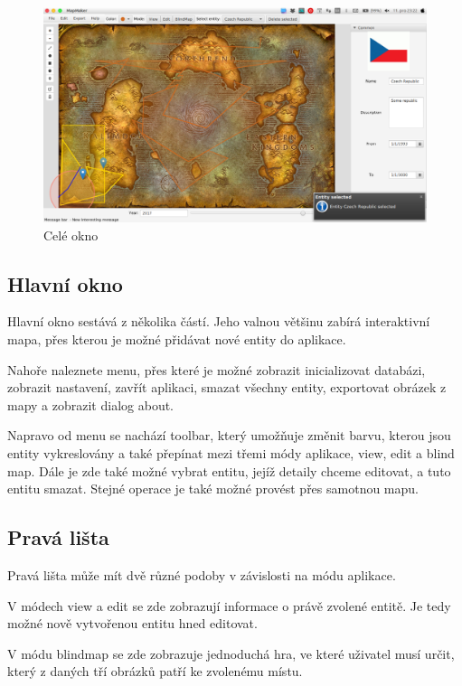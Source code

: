 \documentclass[12pt,a4paper,titlepage]{article}
\begin{document}
\begin{figure}[!htbp]
	\centering
	\includegraphics[scale=0.3]{full_window}
	\caption{Celé okno}
	\label{fullWindow}
\end{figure}

\subsection{Hlavní okno}
Hlavní okno sestává z několika částí. Jeho valnou většinu zabírá interaktivní mapa, přes kterou je možné přidávat nové entity do aplikace. 

Nahoře naleznete menu, přes které je možné zobrazit inicializovat databázi, zobrazit nastavení, zavřít aplikaci, smazat všechny entity, exportovat obrázek z mapy a zobrazit dialog about. 

Napravo od menu se nachází toolbar, který umožňuje změnit barvu, kterou jsou entity vykreslovány a také přepínat mezi třemi módy aplikace, view, edit a blind map. Dále je zde také možné vybrat entitu, jejíž detaily chceme editovat, a tuto entitu smazat. Stejné operace je také možné provést přes samotnou mapu.

\subsection{Pravá lišta}
Pravá lišta může mít dvě různé podoby v závislosti na módu aplikace.

V módech view a edit se zde zobrazují informace o právě zvolené entitě. Je tedy možné nově vytvořenou entitu hned editovat. 

V módu blindmap se zde zobrazuje jednoduchá hra, ve  které uživatel musí určit, který z daných tří obrázků patří ke zvolenému místu.
\end{document}

